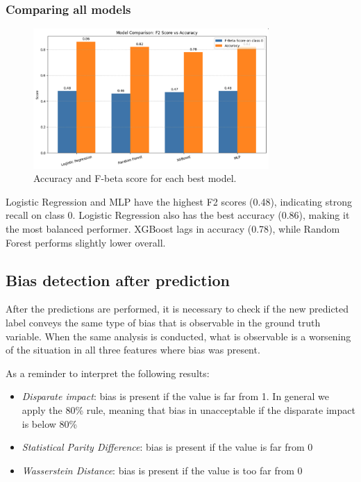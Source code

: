 \documentclass{article}
\begin{document}
\subsubsection{Comparing all models}
\begin{figure}[]
  \centering
  \includegraphics[width=0.8\textwidth]{model_comparison.png}
  \caption{Accuracy and F-beta score for each best model.}
  \label{fig:model_comparison}
\end{figure}
Logistic Regression and MLP have the highest F2 scores (0.48), indicating strong recall on class 0. Logistic Regression also has the best accuracy (0.86), making it the most balanced performer. XGBoost lags in accuracy (0.78), while Random Forest performs slightly lower overall.
\subsection{Bias detection after prediction}
After the predictions are performed, it is necessary to check if the new predicted label conveys the same type of bias that is observable in the ground truth variable. When the same analysis is conducted, what is observable is a worsening of the situation in all three features where bias was present. 

As a reminder to interpret the following results:
\begin{itemize}
    \item \textit{Disparate impact}: bias is present if the value is far from 1. In general we apply the 80\% rule, meaning that bias in unacceptable if the disparate impact is below 80\%
    \item \textit{Statistical Parity Difference}: bias is present if the value is far from 0
    \item \textit{Wasserstein Distance}: bias is present if the value is too far from 0
\end{itemize}
\end{document}
